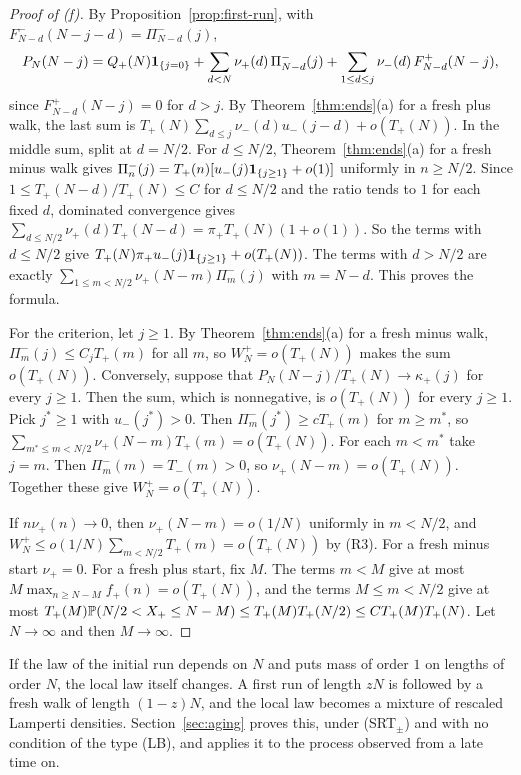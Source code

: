 \begin{proof}[Proof of (f)]
By Proposition~\ref{prop:first-run}, with $F^\minus_{N-d}(N-j-d)=\Pi^\minus_{N-d}(j)$,
\[
 P_N(N-j)=Q_{+}(N)\mathbf{1}_{\{j=0\}}+\sum_{d<N}\nu_{+}(d)\,\Pi^{-}_{N-d}(j)
 +\sum_{1\le d\le j}\nu_{-}(d)\,F^{+}_{N-d}(N-j),
\]
since $F^\plus_{N-d}(N-j)=0$ for $d>j$. By Theorem~\ref{thm:ends}(a) for a fresh plus walk,
the last sum is $T_\plus(N)\sum_{d\le j}\nu_\minus(d)u_\minus(j-d)+o(T_\plus(N))$. In the
middle sum, split at $d=N/2$. For $d\le N/2$, Theorem~\ref{thm:ends}(a) for a fresh minus
walk gives $\Pi^{-}_n(j)=T_{+}(n)[u_{-}(j)\mathbf{1}_{\{j\ge1\}}+o(1)]$ uniformly in
$n\ge N/2$. Since $1\le T_\plus(N-d)/T_\plus(N)\le C$ for $d\le N/2$ and the ratio tends to
$1$ for each fixed $d$, dominated convergence gives
$\sum_{d\le N/2}\nu_\plus(d)T_\plus(N-d)=\pi_\plus T_\plus(N)(1+o(1))$. So the terms with
$d\le N/2$ give $T_{+}(N)\pi_{+} u_{-}(j)\mathbf{1}_{\{j\ge1\}}+o(T_{+}(N))$. The terms
with $d>N/2$ are exactly $\sum_{1\le m<N/2}\nu_\plus(N-m)\Pi^\minus_m(j)$ with $m=N-d$. This
proves the formula.

For the criterion, let $j\ge1$. By Theorem~\ref{thm:ends}(a) for a fresh minus walk,
$\Pi^\minus_m(j)\le C_jT_\plus(m)$ for all $m$, so $W^\plus_N=o(T_\plus(N))$ makes the sum
$o(T_\plus(N))$. Conversely, suppose that $P_N(N-j)/T_\plus(N)\to\kappa_\plus(j)$ for every
$j\ge1$. Then the sum, which is nonnegative, is $o(T_\plus(N))$ for every $j\ge1$. Pick
$j^*\ge1$ with $u_\minus(j^*)>0$. Then $\Pi^\minus_m(j^*)\ge cT_\plus(m)$ for $m\ge m^*$, so
$\sum_{m^*\le m<N/2}\nu_\plus(N-m)T_\plus(m)=o(T_\plus(N))$. For each $m<m^*$ take $j=m$.
Then $\Pi^\minus_m(m)=T_\minus(m)>0$, so $\nu_\plus(N-m)=o(T_\plus(N))$. Together these give
$W^\plus_N=o(T_\plus(N))$.

If $n\nu_\plus(n)\to0$, then $\nu_\plus(N-m)=o(1/N)$ uniformly in $m<N/2$, and
$W^\plus_N\le o(1/N)\sum_{m<N/2}T_\plus(m)=o(T_\plus(N))$ by (R3). For a fresh minus start
$\nu_\plus=0$. For a fresh plus start, fix $M$. The terms $m<M$ give at most
$M\max_{n\ge N-M}f_\plus(n)=o(T_\plus(N))$, and the terms $M\le m<N/2$ give at most
$T_{+}(M)\mathbb{P}(N/2<X_{+}\le N-M)\le T_{+}(M)T_{+}(N/2)\le CT_{+}(M)T_{+}(N)$. Let
$N\to\infty$ and then $M\to\infty$.
\end{proof}

If the law of the initial run depends on $N$ and puts mass of order $1$ on lengths of
order $N$, the local law itself changes. A first run of length $zN$ is followed by a fresh
walk of length $(1-z)N$, and the local law becomes a mixture of rescaled Lamperti densities.
Section~\ref{sec:aging} proves this, under (SRT$_\pm$) and with no condition of the type
(LB), and applies it to the process observed from a late time on.
